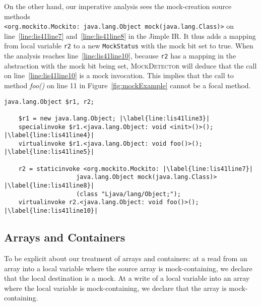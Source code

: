 On the other hand, our imperative analysis sees the mock-creation source methods \\ \texttt{<org.mockito.Mockito: java.lang.Object mock(java.lang.Class)>} on line~\ref{line:lis41line7} and~\ref{line:lis41line8} in the Jimple IR. It thus adds a mapping from local variable \texttt{r2} to a new \texttt{MockStatus} with the mock bit set to true. When the analysis reaches line~\ref{line:lis41line10}, because \texttt{r2} has a mapping in the abstraction with the mock bit being set, \textsc{MockDetector} will deduce that the call on line~\ref{line:lis41line10} is a mock invocation. This implies that the call to method \textit{foo()} on line 11 in Figure~\ref{fig:mockExample} cannot be a focal method.


\begin{lstlisting}[basicstyle=\ttfamily, caption={Jimple Intermediate Representation for the code in Figure~\ref{fig:mockExample}.},
basicstyle=\ttfamily, captionpos=b, label=lis:mockExampleIR, escapechar=|, morekeywords={@Test, specialinvoke, virtualinvoke, staticinvoke}]
	java.lang.Object $r1, r2;
	
	$r1 = new java.lang.Object; |\label{line:lis41line3}|
	specialinvoke $r1.<java.lang.Object: void <init>()>(); |\label{line:lis41line4}|
	virtualinvoke $r1.<java.lang.Object: void foo()>(); |\label{line:lis41line5}|
	
	r2 = staticinvoke <org.mockito.Mockito: |\label{line:lis41line7}|
					java.lang.Object mock(java.lang.Class)> |\label{line:lis41line8}|
					(class "Ljava/lang/Object;");
	virtualinvoke r2.<java.lang.Object: void foo()>(); |\label{line:lis41line10}|
\end{lstlisting}

\subsection{Arrays and Containers}

To be explicit about our treatment of arrays and containers: at a read from an array into a local variable where the source array is mock-containing, we declare that the local destination is a mock. At a write of a local variable into an array where the local variable is mock-containing, we declare that the array is mock-containing.




